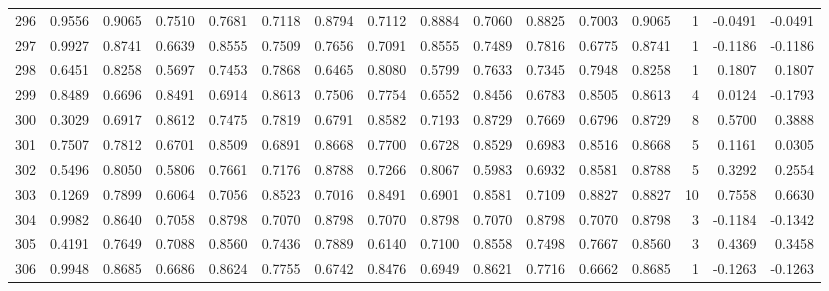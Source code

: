 \begin{tabular}{lrrrrrrrrrrrrrrr}
296 &      0.9556 &  0.9065 &  0.7510 &  0.7681 &  0.7118 &  0.8794 &  0.7112 &  0.8884 &  0.7060 &  0.8825 &   0.7003 &     0.9065 &      1 &                   -0.0491 &                    -0.0491 \\
297 &      0.9927 &  0.8741 &  0.6639 &  0.8555 &  0.7509 &  0.7656 &  0.7091 &  0.8555 &  0.7489 &  0.7816 &   0.6775 &     0.8741 &      1 &                   -0.1186 &                    -0.1186 \\
298 &      0.6451 &  0.8258 &  0.5697 &  0.7453 &  0.7868 &  0.6465 &  0.8080 &  0.5799 &  0.7633 &  0.7345 &   0.7948 &     0.8258 &      1 &                    0.1807 &                     0.1807 \\
299 &      0.8489 &  0.6696 &  0.8491 &  0.6914 &  0.8613 &  0.7506 &  0.7754 &  0.6552 &  0.8456 &  0.6783 &   0.8505 &     0.8613 &      4 &                    0.0124 &                    -0.1793 \\
300 &      0.3029 &  0.6917 &  0.8612 &  0.7475 &  0.7819 &  0.6791 &  0.8582 &  0.7193 &  0.8729 &  0.7669 &   0.6796 &     0.8729 &      8 &                    0.5700 &                     0.3888 \\
301 &      0.7507 &  0.7812 &  0.6701 &  0.8509 &  0.6891 &  0.8668 &  0.7700 &  0.6728 &  0.8529 &  0.6983 &   0.8516 &     0.8668 &      5 &                    0.1161 &                     0.0305 \\
302 &      0.5496 &  0.8050 &  0.5806 &  0.7661 &  0.7176 &  0.8788 &  0.7266 &  0.8067 &  0.5983 &  0.6932 &   0.8581 &     0.8788 &      5 &                    0.3292 &                     0.2554 \\
303 &      0.1269 &  0.7899 &  0.6064 &  0.7056 &  0.8523 &  0.7016 &  0.8491 &  0.6901 &  0.8581 &  0.7109 &   0.8827 &     0.8827 &     10 &                    0.7558 &                     0.6630 \\
304 &      0.9982 &  0.8640 &  0.7058 &  0.8798 &  0.7070 &  0.8798 &  0.7070 &  0.8798 &  0.7070 &  0.8798 &   0.7070 &     0.8798 &      3 &                   -0.1184 &                    -0.1342 \\
305 &      0.4191 &  0.7649 &  0.7088 &  0.8560 &  0.7436 &  0.7889 &  0.6140 &  0.7100 &  0.8558 &  0.7498 &   0.7667 &     0.8560 &      3 &                    0.4369 &                     0.3458 \\
306 &      0.9948 &  0.8685 &  0.6686 &  0.8624 &  0.7755 &  0.6742 &  0.8476 &  0.6949 &  0.8621 &  0.7716 &   0.6662 &     0.8685 &      1 &                   -0.1263 &                    -0.1263 \\

\end{tabular}
